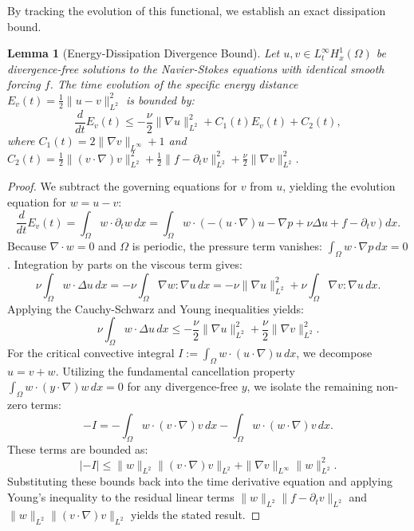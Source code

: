 \documentclass[12pt,a4paper]{article}
\theoremstyle{definition}
\theoremstyle{plain}
\newtheorem{lemma}[definition]{Lemma}
\theoremstyle{remark}
\begin{document}
By tracking the evolution of this functional, we establish an exact dissipation bound.

\begin{lemma}[Energy-Dissipation Divergence Bound]
\label{lem:entropy-bound}
Let $u, v \in L^\infty_t H^1_x(\Omega)$ be divergence-free solutions to the Navier-Stokes equations with identical smooth forcing $f$. The time evolution of the specific energy distance $E_{v}(t) = \frac{1}{2}\| u - v \|_{L^2}^2$ is bounded by:
\begin{equation}
    \frac{d}{dt} E_{v}(t) \le - \frac{\nu}{2} \|\nabla u\|_{L^2}^2 + C_1(t) E_{v}(t) + C_2(t),
\end{equation}
where $C_1(t) = 2\|\nabla v\|_{L^\infty} + 1$ and $C_2(t) = \frac{1}{2}\|(v \cdot \nabla)v\|_{L^2}^2 + \frac{1}{2}\|f - \partial_t v\|_{L^2}^2 + \frac{\nu}{2}\|\nabla v\|_{L^2}^2$.
\end{lemma}

\begin{proof}
We subtract the governing equations for $v$ from $u$, yielding the evolution equation for $w = u - v$:
\begin{equation}
    \frac{d}{dt} E_{v}(t) = \int_\Omega w \cdot \partial_t w \, dx = \int_\Omega w \cdot \left( -(u \cdot \nabla)u - \nabla p + \nu \Delta u + f - \partial_t v \right) dx.
\end{equation}
Because $\nabla \cdot w = 0$ and $\Omega$ is periodic, the pressure term vanishes: $\int_\Omega w \cdot \nabla p \, dx = 0$.
Integration by parts on the viscous term gives:
\begin{equation}
    \nu \int_\Omega w \cdot \Delta u \, dx = - \nu \int_\Omega \nabla w : \nabla u \, dx = - \nu \|\nabla u\|_{L^2}^2 + \nu \int_\Omega \nabla v : \nabla u \, dx.
\end{equation}
Applying the Cauchy-Schwarz and Young inequalities yields:
\begin{equation}
    \nu \int_\Omega w \cdot \Delta u \, dx \le - \frac{\nu}{2} \|\nabla u\|_{L^2}^2 + \frac{\nu}{2} \|\nabla v\|_{L^2}^2.
\end{equation}
For the critical convective integral $I := \int_\Omega w \cdot (u \cdot \nabla)u \, dx$, we decompose $u = v + w$. Utilizing the fundamental cancellation property $\int_\Omega w \cdot (y \cdot \nabla)w \, dx = 0$ for any divergence-free $y$, we isolate the remaining non-zero terms:
\begin{equation}
    - I = - \int_\Omega w \cdot (v \cdot \nabla)v \, dx - \int_\Omega w \cdot (w \cdot \nabla)v \, dx.
\end{equation}
These terms are bounded as:
\begin{equation}
    |-I| \le \|w\|_{L^2} \|(v \cdot \nabla)v\|_{L^2} + \|\nabla v\|_{L^\infty} \|w\|_{L^2}^2.
\end{equation}
Substituting these bounds back into the time derivative equation and applying Young's inequality to the residual linear terms $\|w\|_{L^2} \|f - \partial_t v\|_{L^2}$ and $\|w\|_{L^2} \|(v \cdot \nabla)v\|_{L^2}$ yields the stated result.
\end{proof}
\end{document}
